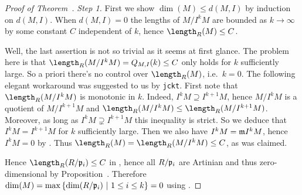 \documentclass[a4paper,parskip=half,numbers=enddot, DIV=12, headheight=30pt]{scrreprt}
\begin{document}
\begin{proof}[Proof of Theorem~]
    \emph{Step 1.} First we show $\dim(M) \leq d(M,I)$ by induction on $d(M,I)$. When $d(M,I) = 0$ the lengths of $M/I^kM$ are bounded as $k\to\infty$ by some constant $C$ independent of $k$, hence $\length_R(M) \leq C$. 
    
    Well, the last assertion is not so trivial as it seems at first glance. The problem here is that $\length_R(M/I^kM)=Q_{M,I}(k)\leq C$ only holds for $k$ sufficiently large. So a priori there's no control over $\length_R(M)$, i.e.\ $k=0$. The following elegant workaround was suggested to us by \texttt{jckt}. First note that $\length_R(M/I^kM)$ is monotonic in $k$. Indeed, $I^kM\supseteq I^{k+1}M$, hence $M/I^kM$ is a quotient of $M/I^{k+1}M$ and $\length_R(M/I^kM)\leq \length_R(M/I^{k+1}M)$. Moreover, as long as $I^kM\supsetneq I^{k+1}M$ this inequality is strict. So we deduce that $I^kM=I^{k+1}M$ for $k$ sufficiently large. Then we also have $I^kM=\mathfrak{m} I^kM$, hence $I^kM=0$ by \NAK. Thus $\length_R(M)=\length_R(M/I^kM)\leq C$, as was claimed.
    
    
     Hence $\length_R(R/\pp_i) \leq C$ in , hence all $R/\mathfrak{p}_i$ are Artinian and thus zero-dimensional by Proposition~. Therefore $\dim(M) = \max\left\{\dim(R/\mathfrak{p}_i)\ \middle|\  1\leq i\leq k\right\} = 0$ using . 
     

\end{proof}
\end{document}
